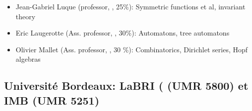 
\begin{itemize}
\item Jean-Gabriel Luque (professor, \CS, 25\%): Symmetric functions
  et al,
  invariant theory%

\item Eric Laugerotte (Ass. professor, \CS, 30\%): %
  Automatons, tree automatons%
\item Olivier Mallet (Ass. professor, \CS, 30 \%): %
  Combinatorics, Dirichlet series, Hopf algebras
\end{itemize}

\vspace{-1.2ex}
\subsection*{Université Bordeaux: LaBRI (%
(UMR 5800) et IMB (UMR 5251)}

